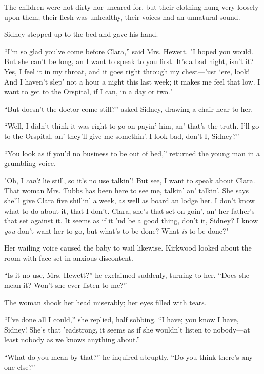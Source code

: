 The children were not dirty nor uncared for, but their clothing hung
very loosely upon them; their flesh was unhealthy, their voices had an
unnatural sound.

Sidney stepped up to the bed and gave his hand.

``I'm so glad you've come before Clara,'' said Mrs. Hewett. "I hoped you
would. {\protect\hypertarget{38}{}{}}But she can't be long, an I want to
speak to you first. It's a bad night, isn't it? Yes, I feel it in my
throat, and it goes right through my chest---'ust `ere, look! And I
haven't slep' not a hour a night this last week; it makes me feel that
low. I want to get to the Orspital, if I can, in a day or two."

``But doesn't the doctor come still?'' asked Sidney, drawing a chair
near to her.

``Well, I didn't think it was right to go on payin' him, an' that's the
truth. I'll go to the Orspital, an' they'll give me somethin'. I look
bad, don't I, Sidney?''

``You look as if you'd no business to be out of bed,'' returned the
young man in a grumbling voice.

"Oh, I \emph{can't} lie still, so it's no use talkin'! But see, I want
to speak about Clara. That woman Mrs. Tubbs has been here to see me,
talkin' an' talkin'. She says she'll give Clara five shillin' a week, as
well as board an lodge her. I don't know what to do about it, that I
don't. Clara, she's that set on goin', an' her father's that set against
it. It seems as {\protect\hypertarget{39}{}{}}if it 'ud be a good thing,
don't it, Sidney? I know \emph{you} don't want her to go, but what's to
be done? What \emph{is} to be done?"

Her wailing voice caused the baby to wail likewise. Kirkwood looked
about the room with face set in anxious discontent.

``Is it no use, Mrs. Hewett?'' he exclaimed suddenly, turning to her.
``Does she mean it? Won't she ever listen to me?''

The woman shook her head miserably; her eyes filled with tears.

``I've done all I could,'' she replied, half sobbing. ``I have; you know
I have, Sidney! She's that 'eadstrong, it seems as if she wouldn't
listen to nobody---at least nobody as we knows anything about.''

``What do you mean by that?'' he inquired abruptly. ``Do you think
there's any one else?''

